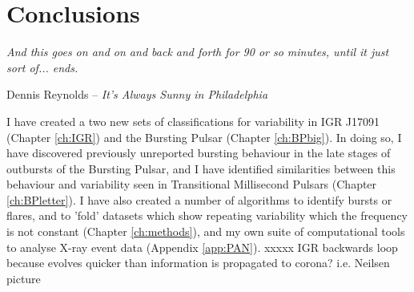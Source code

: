 \chapter{Conclusions}

\epigraph{\textit{And this goes on and on and back and forth for 90 or so minutes, until it just sort of... ends.}}{Dennis Reynolds -- \textit{It's Always Sunny in Philadelphia}}

\vspace{1cm}

\par\noindent I have created a two new sets of classifications for variability in IGR J17091 (Chapter \ref{ch:IGR}) and the Bursting Pulsar (Chapter \ref{ch:BPbig}).  In doing so, I have discovered previously unreported bursting behaviour in the late stages of outbursts of the Bursting Pulsar, and I have identified similarities between this behaviour and variability seen in Transitional Millisecond Pulsars (Chapter \ref{ch:BPletter}).  I have also created a number of algorithms to identify bursts or flares, and to 'fold' datasets which show repeating variability which the frequency is not constant (Chapter \ref{ch:methods}), and my own suite of computational tools to analyse X-ray event data (Appendix \ref{app:PAN}). xxxxx IGR backwards loop because evolves quicker than information is propagated to corona?  i.e. Neilsen picture
